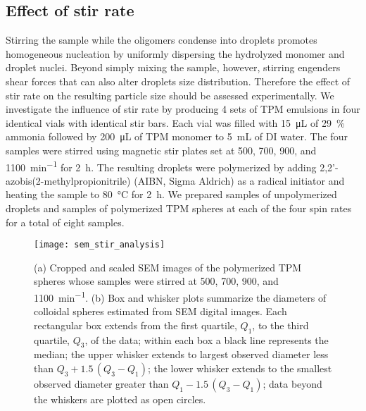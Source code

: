 \subsection{Effect of stir rate}
\label{ssec:stir}
Stirring the sample while the oligomers condense into droplets promotes homogeneous
nucleation by uniformly dispersing the hydrolyzed monomer and droplet nuclei.
Beyond simply mixing the sample, however, stirring engenders shear forces that can
also alter droplets size distribution.
Therefore the effect of stir rate on the resulting particle size should be assessed
experimentally.
We investigate the influence of stir rate by producing \num{4} sets of TPM emulsions
in four identical vials with identical stir bars. Each vial was filled with
\SI{15}{\micro\liter} of \SI{29}{\percent} ammonia followed by
\SI{200}{\micro\liter} of TPM monomer to \SI{5}{\milli\liter} of DI water.
The four samples were stirred 
using magnetic stir plates set at \num{500}, \num{700}, \num{900}, and
\SI{1100}{\minute^{-1}} for \SI{2}{\hour}. 
The resulting droplets were polymerized by adding
\num{2},\num{2}'-azobis(\num{2}-methylpropionitrile) (AIBN, Sigma Aldrich)
as a radical initiator and %
heating the sample to \SI{80}{\celsius} for \SI{2}{\hour}.
We prepared samples of unpolymerized droplets and samples of polymerized TPM spheres
at each of the four spin rates for a total of eight samples.

\begin{figure}
    \centering
    \texttt{[image: sem\_stir\_analysis]}
    \caption{(a) Cropped and scaled SEM images of the polymerized TPM spheres whose
      samples were stirred at \num{500}, \num{700}, \num{900}, and \SI{1100}{\minute^{-1}}.
      (b)  Box and whisker plots summarize the diameters of colloidal spheres estimated from
      SEM digital images. Each rectangular box extends from the first quartile, $Q_1$, to
      the third quartile, $Q_3$, of the data; within each box a black line represents the median;
      the upper whisker extends to largest observed diameter less than $Q_3 + 1.5\, (Q_3 - Q_1)$;
      the lower whisker extends to the smallest observed diameter greater than $Q_1 - 1.5\, (Q_3 - Q_1)$;
      data beyond the whiskers are plotted as open circles. }
    \label{fig:sem_stir_rate}
\end{figure}

